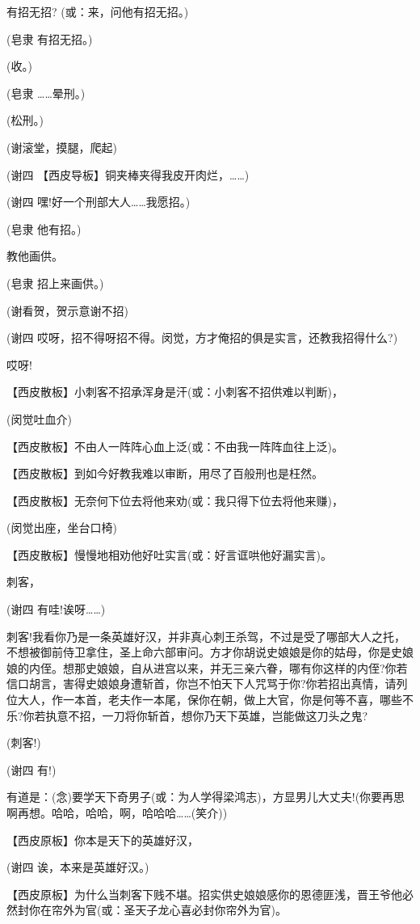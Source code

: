 有招无招? (或：来，问他有招无招。)

(皂隶 有招无招。)

(收。)

(皂隶 \ldots{}\ldots{}晕刑。)

(松刑。)

(谢滚堂，摸腿，爬起)

(谢四 【西皮导板】铜夹棒夹得我皮开肉烂，\ldots{}\ldots{})

(谢四 嘿!好一个刑部大人\ldots{}\ldots{}我愿招。)

(皂隶 他有招。)

教他画供。

(皂隶 招上来画供。)

(谢看贺，贺示意谢不招)

(谢四 哎呀，招不得呀招不得。闵觉，方才俺招的俱是实言，还教我招得什么?)

哎呀!

【西皮散板】小刺客不招承浑身是汗(或：小刺客不招供难以判断)，

(闵觉吐血介)

【西皮散板】不由人一阵阵心血上泛(或：不由我一阵阵血往上泛)。

【西皮散板】到如今好教我难以审断，用尽了百般刑也是枉然。

【西皮散板】无奈何下位去将他来劝(或：我只得下位去将他来赚)，

(闵觉出座，坐台口椅)

【西皮散板】慢慢地相劝他好吐实言(或：好言诓哄他好漏实言)。

刺客，

(谢四 有哇!诶呀\ldots{}\ldots{})

刺客!我看你乃是一条英雄好汉，并非真心刺王杀驾，不过是受了哪部大人之托，不想被御前侍卫拿住，圣上命六部审问。方才你胡说史娘娘是你的姑母，你是史娘娘的内侄。想那史娘娘，自从进宫以来，并无三亲六眷，哪有你这样的内侄?你若信口胡言，害得史娘娘身遭斩首，你岂不怕天下人咒骂于你?你若招出真情，请列位大人，作一本首，老夫作一本尾，保你在朝，做上大官，你是何等不喜，哪些不乐?你若执意不招，一刀将你斩首，想你乃天下英雄，岂能做这刀头之鬼?

(刺客!)

(谢四 有!)

有道是：(念)要学天下奇男子(或：为人学得梁鸿志)，方显男儿大丈夫!(你要再思啊再想。哈哈，哈哈，啊，哈哈哈\ldots{}\ldots{}(笑介))

【西皮原板】你本是天下的英雄好汉，

(谢四 诶，本来是英雄好汉。)

【西皮原板】为什么当刺客下贱不堪。招实供史娘娘感你的恩德匪浅，晋王爷他必然封你在帘外为官(或：圣天子龙心喜必封你帘外为官)。

